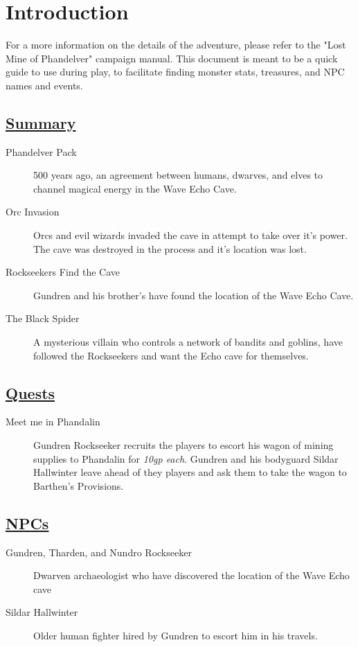 \section{Introduction}

For a more information on the details of the adventure, please refer to the "Lost Mine of Phandelver" campaign manual. This document is meant to be a quick guide to use during play, to facilitate finding monster stats, treasures, and NPC names and events.
	
\subsection*{\underline{Summary}}
\begin{description}
	\item[Phandelver Pack] 500 years ago, an agreement between humans, dwarves, and elves to channel magical energy in the Wave Echo Cave.
	\item[Orc Invasion] Orcs and evil wizards invaded the cave in attempt to take over it's power. The cave was destroyed in the process and it's location was lost.
	\item[Rockseekers Find the Cave] Gundren and his brother's have found the location of the Wave Echo Cave.
	\item[The Black Spider] A mysterious villain who controls a network of bandits and goblins, have followed the Rockseekers and want the Echo cave for themselves.
\end{description}

\subsection*{\underline{Quests}}
\begin{description}
	\item[Meet me in Phandalin] Gundren Rockseeker recruits the players to escort his wagon of mining supplies to Phandalin for \emph{10gp each}. Gundren and his bodyguard Sildar Hallwinter leave ahead of they players and ask them to take the wagon to Barthen's Provisions.
\end{description}

\subsection*{\underline{NPCs}}
\begin{description}
	\item[Gundren, Tharden, and Nundro Rockseeker] Dwarven archaeologist who have discovered the location of the Wave Echo cave
	\item[Sildar Hallwinter] Older human fighter hired by Gundren to escort him in his travels.
\end{description}